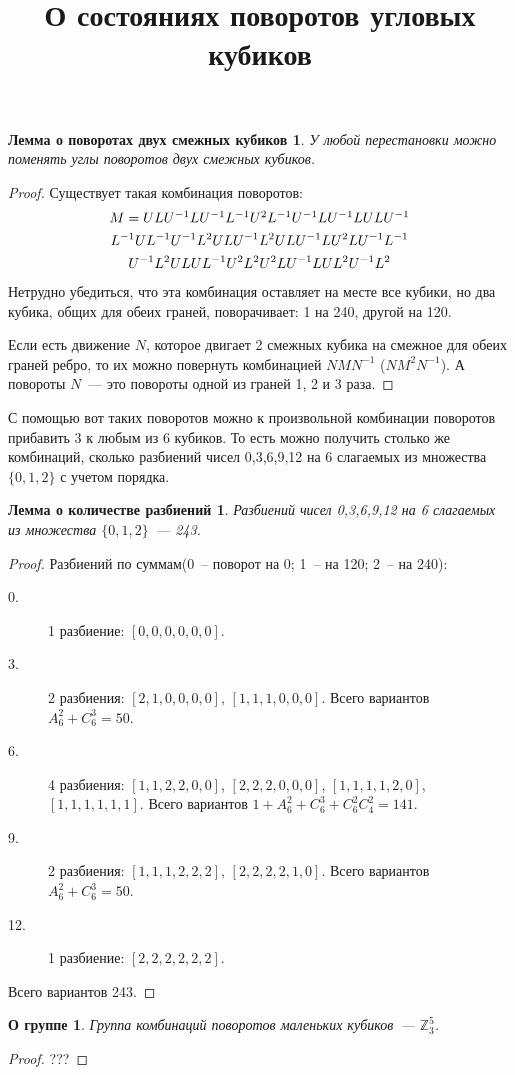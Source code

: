 \documentclass[utf8,a4paper,draft]{article}
\title{О состояниях поворотов угловых кубиков}
\author{}
\date{}
\newtheorem*{lemma1}{Лемма о поворотах двух смежных кубиков}
\newtheorem*{lemma2}{Лемма о количестве разбиений}
\newtheorem*{lemma3}{О группе}
\begin{document}
\maketitle
\begin{lemma1}
У любой перестановки можно поменять углы поворотов двух смежных кубиков.
\end{lemma1}
\begin{proof}
Существует такая комбинация поворотов:
\begin{multline*}
$$
M = ULU^{-1}LU^{-1}L^{-1}U^2L^{-1}U^{-1}LU^{-1}LULU^{-1}       \\
    L^{-1}UL^{-1}U^{-1}L^2ULU^{-1}L^2ULU^{-1}LU^2LU^{-1}L^{-1} \\
    U^{-1}L^2ULUL^{-1}U^2L^2U^2LU^{-1}LUL^2U^{-1}L^2
$$
\end{multline*}
    Нетрудно убедиться, что эта комбинация оставляет на месте все кубики, но
два кубика, общих для обеих граней, поворачивает: 1 на 240\textdegree, другой
на 120\textdegree.

    Если есть движение $N$, которое двигает 2 смежных кубика на смежное для обеих граней ребро,
то их можно повернуть комбинацией $NMN^{-1}$ ($NM^2N^{-1}$).
    А повороты $N$~--- это повороты одной из граней 1, 2 и 3 раза.
\end{proof}
С помощью вот таких поворотов можно к произвольной комбинации поворотов
прибавить 3 к любым из 6 кубиков. То есть можно получить столько же комбинаций,
сколько разбиений чисел 0,3,6,9,12 на 6 слагаемых из множества $\{0,1,2\}$ с
учетом порядка.
\begin{lemma2}
    Разбиений чисел 0,3,6,9,12 на 6 слагаемых из множества $\{0,1,2\}$~--- 243.
\end{lemma2}
\begin{proof}
    Разбиений по суммам(0~-- поворот на 0\textdegree; 1~-- на 120\textdegree; 2~-- на 240\textdegree):
    \begin{description}
    \item[0.] 1 разбиение: $[0,0,0,0,0,0]$.
    \item[3.] 2 разбиения: $[2,1,0,0,0,0]$, $[1,1,1,0,0,0]$. Всего вариантов
        $A^2_6+C^3_6=50$.
    \item[6.] 4 разбиения: $[1,1,2,2,0,0]$, $[2,2,2,0,0,0]$, $[1,1,1,1,2,0]$,
        $[1,1,1,1,1,1]$. Всего вариантов $1+A^2_6+C^3_6+C^2_6C^2_4=141$.
    \item[9.] 2 разбиения: $[1,1,1,2,2,2]$, $[2,2,2,2,1,0]$. Всего вариантов
        $A^2_6+C^3_6=50$.
    \item[12.]1 разбиение: $[2,2,2,2,2,2]$.
    \end{description}
    Всего вариантов 243.
\end{proof}
\begin{lemma3}
Группа комбинаций поворотов маленьких кубиков~--- $\mathbb{Z}_3^5$.
\end{lemma3}
\begin{proof}
    ???
\end{proof}
\end{document}
